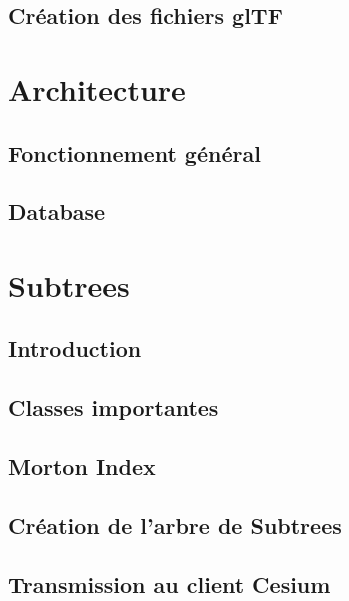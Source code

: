 \documentclass[
    TIC, %
    il, %
]{heig-tb}
\begin{document}
\newpage
\section{Création des fichiers glTF}
\label{sec:gltf}


\newpage
\chapter{Architecture}

\section{Fonctionnement général}
\label{sec:architecture}


\section{Database}
\label{sec:database}


\newpage
\chapter{Subtrees}

\section{Introduction}
\label{sec:subtrees-intro}


\newpage
\section{Classes importantes}
\label{sec:classes}


\newpage
\section{Morton Index}
\label{sec:morton}


\newpage
\section{Création de l'arbre de Subtrees}
\label{sec:subtree-creation}


\newpage
\section{Transmission au client Cesium}
\label{sec:transmission}

\end{document}
